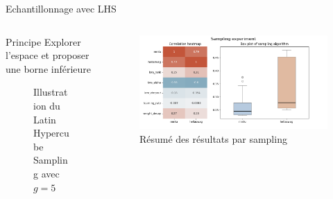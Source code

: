 \begin{frame}{Echantillonnage avec LHS}
    \begin{columns}
        \begin{column}{0.35\textwidth} 
            \begin{block}{Principe}
                Explorer l'espace et proposer une borne inférieure
                
            \end{block}
            \begin{figure}
                \centering
                
                \caption{Illustration du Latin Hypercube Sampling avec $g=5$}
            \end{figure} 
     
            \end{column}
                 
            \begin{column}{0.55\textwidth}
                \begin{figure}
                    \centering
                    \includegraphics[width = \textwidth]{assets/imgs/plots/sampling/lhs.png}
                    \caption{Résumé des résultats par sampling}
                \end{figure} 
            \end{column}
                 
    \end{columns}
\end{frame}


